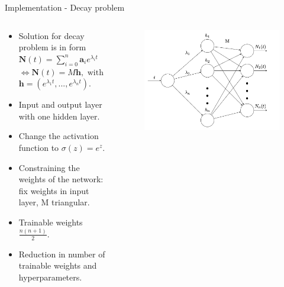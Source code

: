 \documentclass[9pt]{beamer}
\begin{document}
\begin{frame}[fragile]{Implementation - Decay problem}
\begin{columns}[M] %
\begin{column}{0.45\textwidth} %
\begin{itemize}
\item Solution for decay problem is in form $\mathbf{N}(t) = \sum_{i=0}^n \mathbf{a}_i e^{\lambda_i t} $\\$\Leftrightarrow  \mathbf{N}(t) = M\mathbf{h},\text{ with }$\\$ \mathbf{h}=(e^{\lambda_1 t}, ..., e^{\lambda_n t}).$
\item Input and output layer with one hidden layer.
\item Change the activation function to $\sigma(z) = e^z$.
\item Constraining the weights of the network: fix weights in input layer, M triangular.
\item Trainable weights $\frac{n(n+1)}{2}$.
\item Reduction in number of trainable weights and hyperparameters.
\end{itemize}
\end{column}
\begin{column}{0.55\textwidth} %
\begin{figure}
\includegraphics[width=\textwidth]{Screenshot 2023-05-21 at 14.27.59.png}
\end{figure}
\end{column}
\end{columns}
\end{frame}
\end{document}
